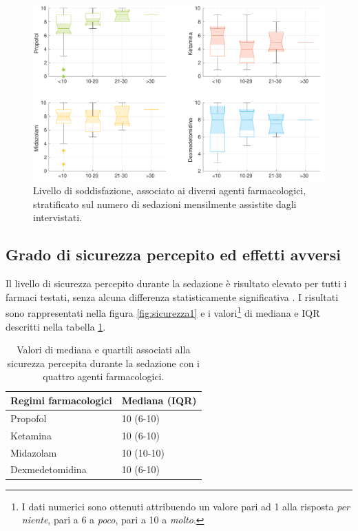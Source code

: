 \begin{figure}[!h]
    \centering
    \includegraphics[width=1\textwidth]{Figure/qualita-strat-frequenza.pdf}
    \caption{Livello di soddisfazione, associato ai diversi agenti farmacologici, stratificato sul numero di sedazioni mensilmente assistite dagli intervistati.}
    \label{fig:qualitafrequenza}
\end{figure}

\newpage

\subsection*{Grado di sicurezza percepito ed effetti avversi}

Il livello di sicurezza percepito durante la sedazione è risultato elevato per tutti i farmaci testati, senza alcuna differenza statisticamente significativa {\color{red}{(Kruskal-Wallis p-value 0.048)}}. I risultati sono rappresentati nella figura \ref{fig:sicurezza1} e i valori\footnote{I dati numerici sono ottenuti attribuendo un valore pari ad 1 alla risposta \emph{per niente}, pari a 6 a \emph{poco}, pari a 10 a \emph{molto}.} di mediana e IQR descritti nella tabella \ref{tab:sicurezzased}.

\bgroup
\def\arraystretch{1.5}
\begin{table}[h]
    \centering
    \begin{tabular}{|l|l|}
         Regimi farmacologici & Mediana (IQR) \\ \hline
       Propofol & 10 (6-10)  \\
       Ketamina & 10 (6-10) \\
       Midazolam & 10 (10-10) \\
       Dexmedetomidina & 10 (6-10) 
    \end{tabular}
    \caption{Valori di mediana e quartili associati alla sicurezza percepita durante la sedazione con i quattro agenti farmacologici.}
    \label{tab:sicurezzased}
\end{table}
\egroup

